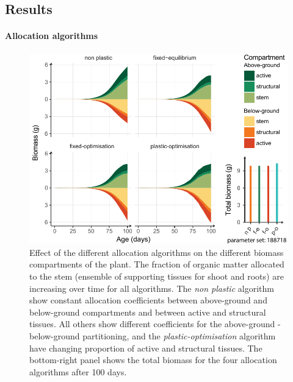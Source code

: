 \subsection{Results}

\paragraph{Allocation algorithms}

\begin{figure}
\includegraphics[width = \textwidth]{./2_PP/Figures/Individual/allocation_rules.pdf}
\caption[Effect of the different allocation algorithms on the different biomass compartments]{Effect of the different allocation algorithms on the different biomass compartments of the plant. The fraction of organic matter allocated to the stem (ensemble of supporting tissues for shoot and roots) are increasing over time for all algorithms. The \textit{non plastic} algorithm show constant allocation coefficients between above-ground and below-ground compartments and between active and structural tissues. All others show different coefficients for the above-ground - below-ground partitioning, and the \textit{plastic-optimisation} algorithm have changing proportion of active and structural tissues. The bottom-right panel shows the total biomass for the four allocation algorithms after 100 days. }\label{fig:allocation}
\end{figure}



